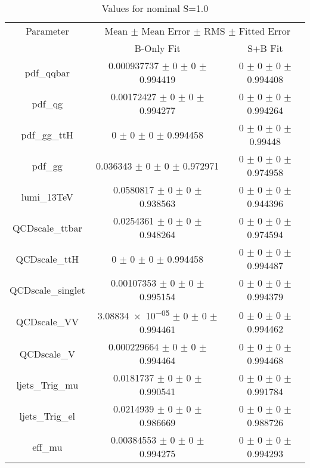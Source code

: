 \begin{table}
\centering
\caption{Values for nominal S=1.0}
\begin{tabular}{ccc}
\toprule
Parameter & \multicolumn{2}{c}{Mean $\pm$ Mean Error $\pm$ RMS $\pm$ Fitted Error}\\
 & B-Only Fit & S+B Fit\\
\midrule
pdf\_qqbar & \num{0.000937737} $\pm$ \num{0} $\pm$ \num{0} $\pm$ \num{0.994419} & \num{0} $\pm$ \num{0} $\pm$ \num{0} $\pm$ \num{0.994408}\\
pdf\_qg & \num{0.00172427} $\pm$ \num{0} $\pm$ \num{0} $\pm$ \num{0.994277} & \num{0} $\pm$ \num{0} $\pm$ \num{0} $\pm$ \num{0.994264}\\
pdf\_gg\_ttH & \num{0} $\pm$ \num{0} $\pm$ \num{0} $\pm$ \num{0.994458} & \num{0} $\pm$ \num{0} $\pm$ \num{0} $\pm$ \num{0.99448}\\
pdf\_gg & \num{0.036343} $\pm$ \num{0} $\pm$ \num{0} $\pm$ \num{0.972971} & \num{0} $\pm$ \num{0} $\pm$ \num{0} $\pm$ \num{0.974958}\\
lumi\_13TeV & \num{0.0580817} $\pm$ \num{0} $\pm$ \num{0} $\pm$ \num{0.938563} & \num{0} $\pm$ \num{0} $\pm$ \num{0} $\pm$ \num{0.944396}\\
QCDscale\_ttbar & \num{0.0254361} $\pm$ \num{0} $\pm$ \num{0} $\pm$ \num{0.948264} & \num{0} $\pm$ \num{0} $\pm$ \num{0} $\pm$ \num{0.974594}\\
QCDscale\_ttH & \num{0} $\pm$ \num{0} $\pm$ \num{0} $\pm$ \num{0.994458} & \num{0} $\pm$ \num{0} $\pm$ \num{0} $\pm$ \num{0.994487}\\
QCDscale\_singlet & \num{0.00107353} $\pm$ \num{0} $\pm$ \num{0} $\pm$ \num{0.995154} & \num{0} $\pm$ \num{0} $\pm$ \num{0} $\pm$ \num{0.994379}\\
QCDscale\_VV & \num{3.08834e-05} $\pm$ \num{0} $\pm$ \num{0} $\pm$ \num{0.994461} & \num{0} $\pm$ \num{0} $\pm$ \num{0} $\pm$ \num{0.994462}\\
QCDscale\_V & \num{0.000229664} $\pm$ \num{0} $\pm$ \num{0} $\pm$ \num{0.994464} & \num{0} $\pm$ \num{0} $\pm$ \num{0} $\pm$ \num{0.994468}\\
ljets\_Trig\_mu & \num{0.0181737} $\pm$ \num{0} $\pm$ \num{0} $\pm$ \num{0.990541} & \num{0} $\pm$ \num{0} $\pm$ \num{0} $\pm$ \num{0.991784}\\
ljets\_Trig\_el & \num{0.0214939} $\pm$ \num{0} $\pm$ \num{0} $\pm$ \num{0.986669} & \num{0} $\pm$ \num{0} $\pm$ \num{0} $\pm$ \num{0.988726}\\
eff\_mu & \num{0.00384553} $\pm$ \num{0} $\pm$ \num{0} $\pm$ \num{0.994275} & \num{0} $\pm$ \num{0} $\pm$ \num{0} $\pm$ \num{0.994293}\\

\end{tabular}
\end{table}
